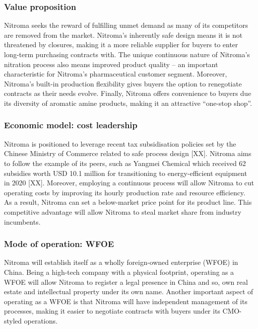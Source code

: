 \subsubsection{Value proposition}
Nitroma seeks the reward of fulfilling unmet demand as many of its competitors are removed from the market. Nitroma’s inherently safe design means it is not threatened by closures, making it a more reliable supplier for buyers to enter long-term purchasing contracts with. The unique continuous nature of Nitroma’s nitration process also means improved product quality – an important characteristic for Nitroma’s pharmaceutical customer segment. Moreover, Nitroma’s built-in production flexibility gives buyers the option to renegotiate contracts as their needs evolve. Finally, Nitroma offers convenience to buyers due its diversity of aromatic amine products, making it an attractive “one-stop shop”.

\subsubsection{Economic model: cost leadership}
Nitroma is positioned to leverage recent tax subsidisation policies set by the Chinese Ministry of Commerce related to safe process design [XX]. Nitroma aims to follow the example of its peers, such as Yangmei Chemical which received 62 subsidies worth USD 10.1 million for transitioning to energy-efficient equipment in 2020 [XX]. Moreover, employing a continuous process will allow Nitroma to cut operating costs by improving its hourly production rate and resource efficiency. As a result, Nitroma can set a below-market price point for its product line. This competitive advantage will allow Nitroma to steal market share from industry incumbents. 

\subsubsection{Mode of operation: WFOE}
Nitroma will establish itself as a wholly foreign-owned enterprise (WFOE) in China. Being a high-tech company with a physical footprint, operating as a WFOE will allow Nitroma to register a legal presence in China and so, own real estate and intellectual property under its own name. Another important aspect of operating as a WFOE is that Nitroma will have independent management of its processes, making it easier to negotiate contracts with buyers under its CMO-styled operations.


